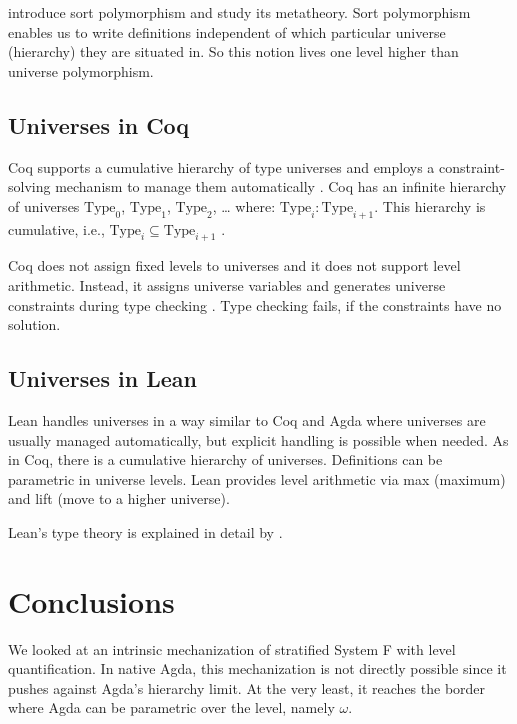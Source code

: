 \documentclass[manuscript,screen,review,anonymous]{acmart}
\begin{document}
\citet{DBLP:journals/pacmpl/PoiretGMPSTT25} introduce sort
polymorphism and study its metatheory. Sort polymorphism enables us to
write definitions independent of which particular universe (hierarchy)
they are situated in. So this notion lives one level higher than
universe polymorphism.

\subsection{Universes in Coq}
\label{sec:universes-coq}

Coq supports a cumulative hierarchy of type universes and employs a
constraint-solving mechanism to manage them automatically \cite{DBLP:journals/pacmpl/SozeauBFTW20,DBLP:conf/itp/SozeauT14}. 
Coq has an infinite hierarchy of universes
\( \text{Type}_0 \), \( \text{Type}_1 \), \( \text{Type}_2 \), … where:
\(\text{Type}_i : \text{Type}_{i+1} \).
This hierarchy is cumulative, i.e., \(\text{Type}_i \subseteq \text{Type}_{i+1} \) .

Coq does not assign fixed levels to universes and it does not support
level arithmetic. Instead, it assigns 
universe variables and generates universe constraints during type
checking \cite{Herbelin2005TypeIW}. Type checking fails, if the constraints have no solution.


\subsection{Universes in Lean}
\label{sec:universes-lean}


Lean handles universes in a way similar to Coq and Agda where
universes are usually managed automatically, but explicit handling is possible when needed.
As in Coq, there is a cumulative hierarchy of universes.
Definitions can be parametric in universe levels.
Lean provides level arithmetic via max (maximum) and lift (move to a
higher universe).


Lean's type theory is explained in detail by \citet{carneiro19:_type_theor_lean}.



\section{Conclusions}
\label{sec:conclusions}
We looked at an intrinsic mechanization of stratified System F with level quantification.
In native Agda, this mechanization is not directly possible since it pushes against Agda's hierarchy limit.
At the very least, it reaches the border where Agda can be parametric over the level, namely $\omega$.
\end{document}
